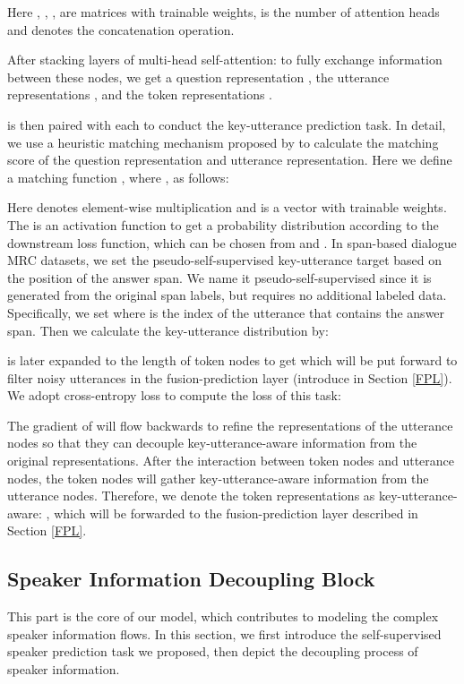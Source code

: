 \documentclass[11pt]{article}
\begin{document}
	Here , , ,  are matrices with trainable weights,  is the number of attention heads and  denotes the concatenation operation.
	
	After stacking  layers of multi-head self-attention:  to fully exchange information between these nodes, we get a question representation , the utterance representations , and the token representations .
	
	 is then paired with each  to conduct the key-utterance prediction task. In detail, we use a heuristic matching mechanism proposed by \citep{mou2016natural} to calculate the matching score of the question representation and utterance representation. Here we define a matching function , where , as follows:
	
	Here  denotes element-wise multiplication and  is a vector with trainable weights. The  is an activation function to get a probability distribution according to the downstream loss function, which can be chosen from  and . In span-based dialogue MRC datasets, we set the pseudo-self-supervised key-utterance target based on the position of the answer span. We name it pseudo-self-supervised since it is generated from the original span labels, but requires no additional labeled data. Specifically, we set  where  is the index of the utterance that contains the answer span. Then we calculate the key-utterance distribution by:
	
	 is later expanded to the length of token nodes to get  which will be put forward to filter noisy utterances in the fusion-prediction layer (introduce in Section \ref{FPL}). We adopt cross-entropy loss to compute the loss of this task:
	
	The gradient of  will flow backwards to refine the representations of the utterance nodes so that they can decouple key-utterance-aware information from the original representations. After the interaction between token nodes and utterance nodes, the token nodes will gather key-utterance-aware information from the utterance nodes. Therefore, we denote the token representations as key-utterance-aware: , which will be forwarded to the fusion-prediction layer described in Section \ref{FPL}.
	
	\subsection{Speaker Information Decoupling Block}
	\label{SIDB}
	This part is the core of our model, which contributes to modeling the complex speaker information flows. In this section, we first introduce the self-supervised speaker prediction task we proposed, then depict the decoupling process of speaker information.
\end{document}
